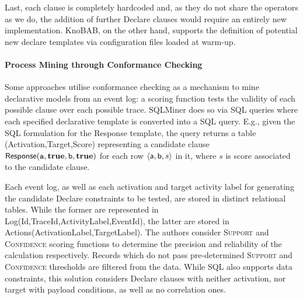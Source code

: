 Last, each clause is completely hardcoded and, as they do not share the operators as we do, the addition of further Declare clauses would require an entirely new implementation. KnoBAB, on the other hand, supports the definition of potential new declare templates via configuration files loaded at warm-up. %




\paragraph*{Process Mining through Conformance Checking}
Some approaches utilise conformance checking as a mechanism to mine declarative {models}  from an event log: a scoring function tests %
the validity of each possible clause over each possible trace. %
SQLMiner \cite{SchonigRCJM16} {does so via} SQL queries \cite{Schonig15} {where e}ach specified declarative {template} %
{is} converted into a SQL query. E.g., given the SQL formulation for the \textsf{Response} template, the query returns a table \textsf{(Activation,Target,Score)} representing a candidate clause $\textsf{Response}(\texttt{a},\textbf{true},\texttt{b},\textbf{true})$ for each row $\braket{\textsf{a},\textsf{b},s}$ in it, where $s$ is   score associated to the candidate clause.

Each event log, as well as each activation and target activity label for generating the candidate Declare constraints to be tested, are stored in distinct relational tables. While the former are represented in  \textsf{Log(Id,TraceId,ActivityLabel,EventId)}, the latter are stored in \textsf{Actions(ActivationLabel,TargetLabel)}. The authors consider 
\textsc{Support} and \textsc{Confidence} scoring functions to determine the precision and reliability of the calculation respectively. Records which do not pass pre-determined \textsc{Support} and \textsc{Confidence} thresholds are filtered from the data. While SQL also supports data constraints, this solution considers Declare clauses with neither activation, nor target %
with payload conditions, as well as no correlation ones.

